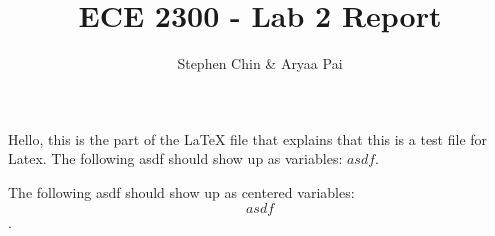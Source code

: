 \message{ !name(lab_2_report.tex)}\documentclass{article}
\title{ECE 2300 - Lab 2 Report}
\author{Stephen Chin & Aryaa Pai}
\date{}
\begin{document}


Hello, this is the part of the LaTeX file that explains that this is a test file for Latex.
The following asdf should show up as variables: $asdf$.

The following asdf should show up as centered variables: \[asdf\].
\end{document}
